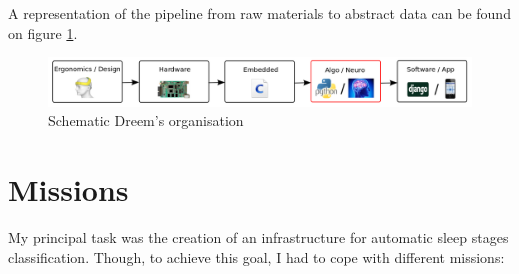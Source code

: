 \documentclass[12pt]{report}
\begin{document}
A representation of the pipeline from raw materials to abstract data can be found on figure \ref{fig:teams}.

\begin{figure}[H]
\centering
\includegraphics[width=1\textwidth]{img/chap1/teams.png}
\caption{\label{fig:teams}Schematic Dreem's organisation}
\end{figure}

\section{Missions}

My principal task was the creation of an infrastructure for automatic sleep stages classification. Though, to achieve this goal, I had to cope with different missions:
\end{document}
